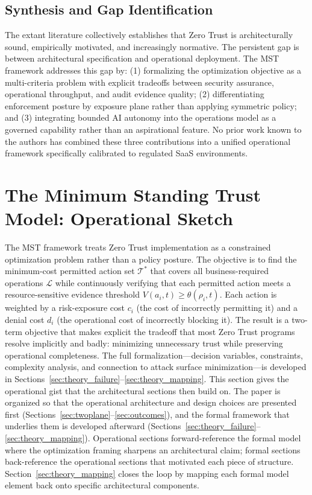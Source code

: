 \documentclass[acmlarge]{acmart}
\begin{document}
\subsection{Synthesis and Gap Identification}

The extant literature collectively establishes that Zero Trust is architecturally sound,
empirically motivated, and increasingly normative. The persistent gap is between
architectural specification and operational deployment. The MST framework addresses this
gap by: (1) formalizing the optimization objective as a multi-criteria problem with
explicit tradeoffs between security assurance, operational throughput, and audit
evidence quality; (2) differentiating enforcement posture by exposure plane rather than
applying symmetric policy; and (3) integrating bounded AI autonomy into the operations
model as a governed capability rather than an aspirational feature. No prior work known
to the authors has combined these three contributions into a unified operational framework
specifically calibrated to regulated SaaS environments.

\section{The Minimum Standing Trust Model: Operational Sketch}
\label{sec:mst_sketch}

The MST framework treats Zero Trust implementation as a constrained optimization
problem rather than a policy posture. The objective is to find the minimum-cost
permitted action set $\mathcal{T}^{*}$ that covers all business-required operations
$\mathcal{L}$ while continuously verifying that each permitted action meets a
resource-sensitive evidence threshold $V(a_i, t) \geq \theta(\rho_i, t)$. Each
action is weighted by a risk-exposure cost $c_i$ (the cost of incorrectly permitting
it) and a denial cost $d_i$ (the operational cost of incorrectly blocking it).
The result is a two-term objective that makes explicit the tradeoff that most Zero
Trust programs resolve implicitly and badly: minimizing unnecessary trust while
preserving operational completeness. The full formalization---decision variables,
constraints, complexity analysis, and connection to attack surface minimization---is
developed in Sections~\ref{sec:theory_failure}--\ref{sec:theory_mapping}. This
section gives the operational gist that the architectural sections then build on.
The paper is organized so that the operational architecture and design choices
are presented first (Sections~\ref{sec:twoplane}--\ref{sec:outcomes}), and the
formal framework that underlies them is developed afterward
(Sections~\ref{sec:theory_failure}--\ref{sec:theory_mapping}). Operational
sections forward-reference the formal model where the optimization framing
sharpens an architectural claim; formal sections back-reference the operational
sections that motivated each piece of structure. Section~\ref{sec:theory_mapping}
closes the loop by mapping each formal model element back onto specific
architectural components.
\end{document}
